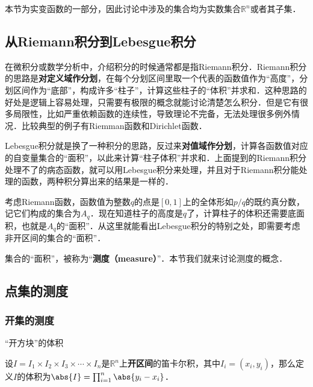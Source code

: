 


本节为实变函数的一部分，因此讨论中涉及的集合均为实数集合$\mathbb{R}^n$或者其子集．


\subsection{从Riemann积分到Lebesgue积分}


在微积分或数学分析中，介绍积分的时候通常都是指Riemann积分．Riemann积分的思路是\textbf{对定义域作分划}，在每个分划区间里取一个代表的函数值作为“高度”，分划区间作为“底部”，构成许多“柱子”，计算这些柱子的“体积”并求和．这种思路的好处是逻辑上容易处理，只需要有极限的概念就能讨论清楚怎么积分．但是它有很多局限性，比如严重依赖函数的连续性，导致理论不完备，无法处理很多例外情况．比较典型的例子有Riemman函数和Dirichlet函数．

Lebesgue积分就是换了一种积分的思路，反过来\textbf{对值域作分划}，计算各函数值对应的自变量集合的“面积”，以此来计算“柱子体积”并求和．上面提到的Riemann积分处理不了的病态函数，就可以用Lebesgue积分来处理，并且对于Riemann积分能处理的函数，两种积分算出来的结果是一样的．

考虑Riemann函数，函数值为整数$q$的点是$[0, 1]$上的全体形如$p/q$的既约真分数，记它们构成的集合为$A_q$．现在知道柱子的高度是$q$了，计算柱子的体积还需要底面积，也就是$A_q$的“面积”．从这里就能看出Lebesgue积分的特别之处，即需要考虑非开区间的集合的“面积”．

集合的“面积”，被称为“\textbf{测度（measure）}”．本节我们就来讨论测度的概念．



\subsection{点集的测度}

\subsubsection{开集的测度}

\begin{definition}{“开方块”的体积}\label{SetMet_def1}

设$I=I_1\times I_2\times I_3\times\cdots\times I_n$是$\mathbb{R}^n$上\textbf{开区间}的笛卡尔积，其中$I_i=(x_i, y_i)$，那么定义$I$的体积为$\abs{I} = \prod_{i=1}^n \abs{y_i-x_i}$．

\end{definition}

